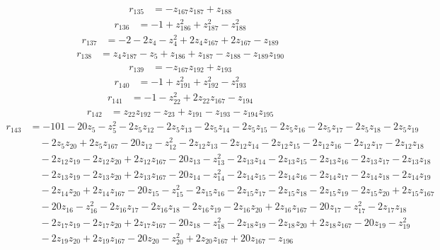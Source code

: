 \begin{align*}
r_{135} &= -z_{167}z_{187} + z_{188}
\end{align*}
\begin{align*}
r_{136} &= -1 + z_{186}^{2} + z_{187}^{2} - z_{188}^{2}
\end{align*}
\begin{align*}
r_{137} &= -2 - 2z_{4} - z_{4}^{2} + 2z_{4}z_{167} + 2z_{167} - z_{189}
\end{align*}
\begin{align*}
r_{138} &= z_{4}z_{187} - z_{5} + z_{186} + z_{187} - z_{188} - z_{189}z_{190}
\end{align*}
\begin{align*}
r_{139} &= -z_{167}z_{192} + z_{193}
\end{align*}
\begin{align*}
r_{140} &= -1 + z_{191}^{2} + z_{192}^{2} - z_{193}^{2}
\end{align*}
\begin{align*}
r_{141} &= -1 - z_{22}^{2} + 2z_{22}z_{167} - z_{194}
\end{align*}
\begin{align*}
r_{142} &= z_{22}z_{192} - z_{23} + z_{191} - z_{193} - z_{194}z_{195}
\end{align*}
\begin{align*}
r_{143} &= -101 - 20z_{5} - z_{5}^{2} - 2z_{5}z_{12} - 2z_{5}z_{13} - 2z_{5}z_{14} - 2z_{5}z_{15} - 2z_{5}z_{16} - 2z_{5}z_{17} - 2z_{5}z_{18} - 2z_{5}z_{19} \\
&\quad  - 2z_{5}z_{20} + 2z_{5}z_{167} - 20z_{12} - z_{12}^{2} - 2z_{12}z_{13} - 2z_{12}z_{14} - 2z_{12}z_{15} - 2z_{12}z_{16} - 2z_{12}z_{17} - 2z_{12}z_{18} \\
&\quad  - 2z_{12}z_{19} - 2z_{12}z_{20} + 2z_{12}z_{167} - 20z_{13} - z_{13}^{2} - 2z_{13}z_{14} - 2z_{13}z_{15} - 2z_{13}z_{16} - 2z_{13}z_{17} - 2z_{13}z_{18} \\
&\quad  - 2z_{13}z_{19} - 2z_{13}z_{20} + 2z_{13}z_{167} - 20z_{14} - z_{14}^{2} - 2z_{14}z_{15} - 2z_{14}z_{16} - 2z_{14}z_{17} - 2z_{14}z_{18} - 2z_{14}z_{19} \\
&\quad  - 2z_{14}z_{20} + 2z_{14}z_{167} - 20z_{15} - z_{15}^{2} - 2z_{15}z_{16} - 2z_{15}z_{17} - 2z_{15}z_{18} - 2z_{15}z_{19} - 2z_{15}z_{20} + 2z_{15}z_{167} \\
&\quad  - 20z_{16} - z_{16}^{2} - 2z_{16}z_{17} - 2z_{16}z_{18} - 2z_{16}z_{19} - 2z_{16}z_{20} + 2z_{16}z_{167} - 20z_{17} - z_{17}^{2} - 2z_{17}z_{18} \\
&\quad  - 2z_{17}z_{19} - 2z_{17}z_{20} + 2z_{17}z_{167} - 20z_{18} - z_{18}^{2} - 2z_{18}z_{19} - 2z_{18}z_{20} + 2z_{18}z_{167} - 20z_{19} - z_{19}^{2} \\
&\quad  - 2z_{19}z_{20} + 2z_{19}z_{167} - 20z_{20} - z_{20}^{2} + 2z_{20}z_{167} + 20z_{167} - z_{196}
\end{align*}
